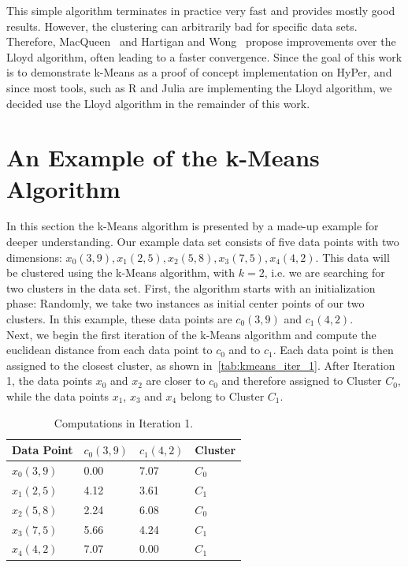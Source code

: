 This simple algorithm terminates in practice very fast and provides mostly good results. However, the clustering can arbitrarily bad for specific data sets. Therefore, MacQueen~\parencite{macqueen1967some} and Hartigan and Wong~\parencite{hartigan1979algorithm} propose improvements over the Lloyd algorithm, often leading to a faster convergence. Since the goal of this work is to demonstrate k-Means as a proof of concept implementation on HyPer, and since most tools, such as R and Julia are implementing the Lloyd algorithm, we decided use the Lloyd algorithm in the remainder of this work. 

\section{An Example of the k-Means Algorithm}

In this section the k-Means algorithm is presented by a made-up example for deeper understanding. Our example data set consists of five data points with two dimensions: $x_0(3,9), x_1(2,5), x_2(5,8), x_3(7,5), x_4(4,2)$. This data will be clustered using the k-Means algorithm, with $k = 2$, i.e. we are searching for two clusters in the data set. First, the algorithm starts with an initialization phase: Randomly, we take two instances as initial center points of our two clusters. In this example, these data points are $c_0(3,9)$ and $c_1(4,2)$. 
\\
Next, we begin the first iteration of the k-Means algorithm and compute the euclidean distance from each data point to $c_0$ and to $c_1$. Each data point is then assigned to the closest cluster, as shown in~\autoref{tab:kmeans_iter_1}. After Iteration 1, the data points $x_0$ and $x_2$ are closer to $c_0$ and therefore assigned to Cluster $C_0$, while the data points $x_1$, $x_3$ and $x_4$ belong to Cluster $C_1$.

\begin{table}[htsb]
\caption[Computations in Iteration 1]{Computations in Iteration 1.}\label{tab:kmeans_iter_1}
\centering
\begin{tabular}{l l l l}
\toprule
  Data Point & $c_0(3,9)$ & $c_1(4,2)$ & Cluster \\
\midrule
    $x_0(3,9)$ & 0.00 & 7.07 & $C_0$ \\
    $x_1(2,5)$ & 4.12 & 3.61 & $C_1$ \\
    $x_2(5,8)$ & 2.24 & 6.08 & $C_0$ \\
    $x_3(7,5)$ & 5.66 & 4.24 & $C_1$ \\
    $x_4(4,2)$ & 7.07 & 0.00 & $C_1$ \\
\bottomrule
\end{tabular}
\end{table}

